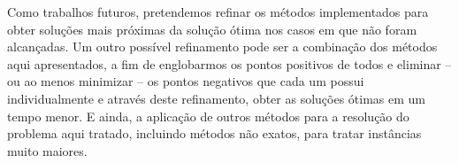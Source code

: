 \documentclass{article}
\begin{document}
	Como trabalhos futuros, pretendemos refinar os métodos implementados para obter soluções mais próximas da solução ótima nos casos em que não foram alcançadas. Um outro possível refinamento pode ser a combinação dos métodos aqui apresentados, a fim de englobarmos os pontos positivos de todos e eliminar -- ou ao menos minimizar -- os pontos negativos que cada um possui individualmente e através deste refinamento, obter as soluções ótimas em um tempo menor. E ainda, a aplicação de outros métodos para a resolução do problema aqui tratado, incluindo métodos não exatos, para tratar instâncias muito maiores.
	



\end{document}
